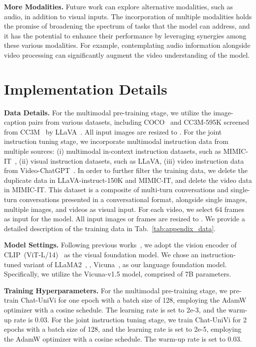 \documentclass[10pt,twocolumn,letterpaper]{article}
\newcommand{\myparagraph}[1]{\textbf{#1}\hspace{1.8ex}}
\begin{document}
\noindent \myparagraph{More Modalities.}
Future work can explore alternative modalities, such as audio, in addition to visual inputs. The incorporation of multiple modalities holds the promise of broadening the spectrum of tasks that the model can address, and it has the potential to enhance their performance by leveraging synergies among these various modalities. For example, contemplating audio information alongside video processing can significantly augment the video understanding of the model.

\section{Implementation Details}\label{Experimental Setup1}
\noindent \myparagraph{Data Details.} For the multimodal pre-training stage, we utilize the image-caption pairs from various datasets, including COCO~\cite{chen2015microsoft} and CC3M-595K screened from CC3M~\cite{sharma2018conceptual} by LLaVA~\cite{liu2023visual}. All input images are resized to . For the joint instruction tuning stage, we incorporate multimodal instruction data from multiple sources: (i) multimodal in-context instruction datasets, such as MIMIC-IT~\cite{li2023otter,antol2015vqa,hudson2019gqa}, (ii) visual instruction datasets, such as LLaVA, (iii) video instruction data from Video-ChatGPT~\cite{maaz2023video}. In order to further filter the training data, we delete the duplicate data in LLaVA-instruct-150K and MIMIC-IT, and delete the video data in MIMIC-IT. This dataset is a composite of multi-turn conversations and single-turn conversations presented in a conversational format, alongside single images, multiple images, and videos as visual input. For each video, we select 64 frames as input for the model. All input images or frames are resized to . We provide a detailed description of the training data in Tab.~\ref{tab:appendix_data}.

\noindent \myparagraph{Model Settings.} Following previous works~\cite{liu2023visual}, we adopt the vision encoder of CLIP~(ViT-L/14)~\cite{radford2021learning} as the visual foundation model. We chose an instruction-tuned variant of LLaMA2~\cite{touvron2023llama2}, \ie, Vicuna~\cite{vicuna}, as our language foundation model. Specifically, we utilize the Vicuna-v1.5 model, comprised of 7B parameters.

\noindent \myparagraph{Training Hyperparameters.}
For the multimodal pre-training stage, we pre-train Chat-UniVi for one epoch with a batch size of 128, employing the AdamW optimizer with a cosine schedule. The learning rate is set to 2e-3, and the warm-up rate is 0.03. For the joint instruction tuning stage, we train Chat-UniVi for 2 epochs with a batch size of 128, and the learning rate is set to 2e-5, employing the AdamW optimizer with a cosine schedule. The warm-up rate is set to 0.03.
\end{document}

